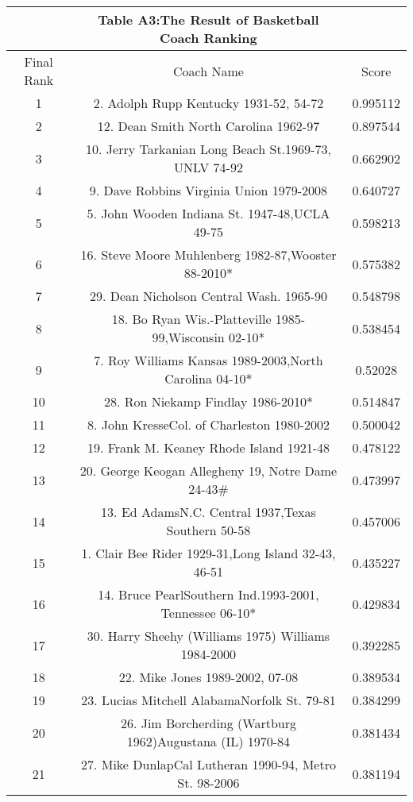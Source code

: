 \documentclass{mcmthesis}
\begin{document}
\begin{appendices}
\begin{longtable}{ccc}
 &Table A3:The Result of Basketball Coach Ranking&\\
 \hline
Final Rank & Coach Name & Score\\
\hline
\endhead
1     & 2. Adolph Rupp  Kentucky 1931-52, 54-72 & 0.995112 \\
    2     & 12. Dean Smith North Carolina 1962-97 & 0.897544 \\
    3     & 10. Jerry Tarkanian Long Beach St.1969-73, UNLV 74-92& 0.662902 \\
    4     & 9. Dave Robbins Virginia Union 1979-2008 & 0.640727 \\
    5     & 5. John Wooden Indiana St. 1947-48,UCLA 49-75  & 0.598213 \\
    6     & 16. Steve Moore  Muhlenberg 1982-87,Wooster 88-2010* & 0.575382 \\
    7     & 29. Dean Nicholson Central Wash. 1965-90  & 0.548798 \\
    8     & 18. Bo Ryan Wis.-Platteville 1985-99,Wisconsin 02-10*  & 0.538454 \\
    9     & 7. Roy Williams Kansas 1989-2003,North Carolina 04-10* & 0.52028 \\
    10    & 28. Ron Niekamp  Findlay 1986-2010* & 0.514847 \\
    11    & 8. John KresseCol. of Charleston 1980-2002 & 0.500042 \\
    12    & 19. Frank M. Keaney Rhode Island 1921-48 & 0.478122 \\
    13    & 20. George Keogan Allegheny 19, Notre  Dame 24-43\#  & 0.473997 \\
    14    & 13. Ed AdamsN.C. Central 1937,Texas Southern 50-58 & 0.457006 \\
    15    & 1. Clair Bee Rider 1929-31,Long Island 32-43, 46-51 & 0.435227 \\
    16    & 14. Bruce PearlSouthern Ind.1993-2001, Tennessee 06-10* & 0.429834 \\
    17    & 30. Harry Sheehy (Williams 1975) Williams 1984-2000  & 0.392285 \\
    18    & 22. Mike Jones 1989-2002, 07-08 & 0.389534 \\
    19    & 23. Lucias Mitchell AlabamaNorfolk St. 79-81 & 0.384299 \\
    20    & 26. Jim Borcherding (Wartburg 1962)Augustana (IL) 1970-84 & 0.381434 \\
    21    & 27. Mike DunlapCal Lutheran 1990-94, Metro St. 98-2006 & 0.381194 \\

\end{longtable}
\end{appendices}
\end{document}
